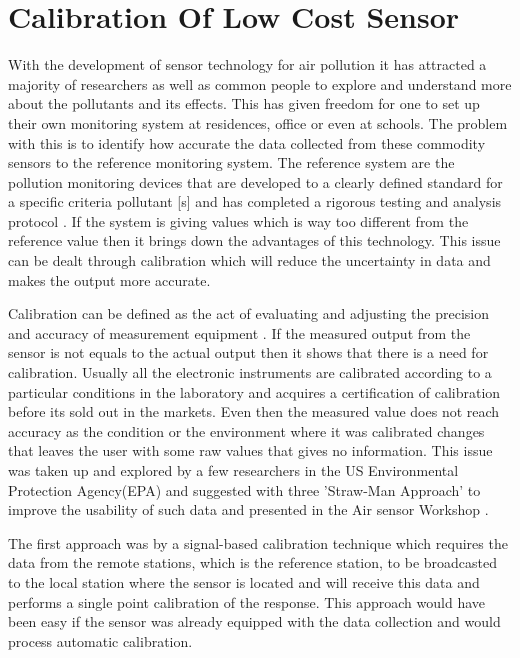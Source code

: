 \chapter{Calibration Of Low Cost Sensor}

With the development of sensor technology for air pollution it has attracted a majority of researchers as well as common people to explore and understand more about the pollutants and its effects. This has given freedom for one to set up their own monitoring system at residences, office or even at schools. The problem with this is to identify how accurate the data collected from these commodity sensors to the reference monitoring system. The reference system are the pollution monitoring devices that are developed to a clearly defined standard for a specific criteria pollutant [s] and has completed a rigorous testing and analysis protocol \cite{Hall2014}. If the system is giving values which is way too different from the reference value then it brings down the advantages of this technology. This issue can be dealt through calibration which will reduce the uncertainty in data and makes the output more accurate. 
\par 
Calibration can be defined as the act of evaluating and adjusting the precision and accuracy of measurement equipment \cite{Kejuruteraan2018}. If the measured output from the sensor is not equals to the actual output then it shows that there is a need for calibration. Usually all the electronic instruments are calibrated according to a particular conditions in the laboratory and acquires a certification of calibration before its sold out in the markets. Even then the measured value does not reach accuracy as the condition or the environment where it was calibrated changes that leaves the user with some raw values that gives no information. This issue was taken up and explored by a few researchers in the US Environmental Protection Agency(EPA) and suggested with three 'Straw-Man Approach' to improve the usability of such data and presented in the Air sensor Workshop \cite{Williams2013}. 

The first approach was by a signal-based calibration technique which requires the data from the remote stations, which is the reference station, to be broadcasted to the local station where the sensor is located and will receive this data and performs a single point calibration of the response. This approach would have been easy if the sensor was already equipped with the data collection and would process automatic calibration. 

